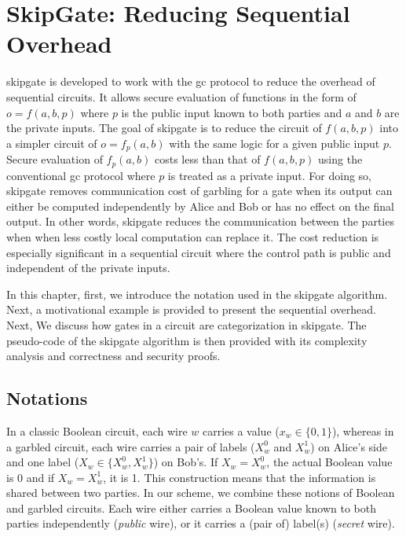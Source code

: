 \chapter{{SkipGate}: Reducing Sequential Overhead}\label{chap:skipgate}
\gls{skipgate} is developed to work with the \acrfull{gc} protocol to reduce the overhead of sequential circuits.
It allows secure evaluation of functions in the form of $o = f(a, b, p)$ where $p$ is the public input known to both parties and $a$ and $b$ are the private inputs.
The goal of \gls{skipgate} is to reduce the circuit of $f(a, b, p)$ into a simpler circuit of $o = f_p(a,b)$ with the same logic for a given public input $p$.
Secure evaluation of $f_p(a,b)$ costs less than that of $f(a, b, p)$ using the conventional \acrshort{gc} protocol where $p$ is treated as a private input.
For doing so, \gls{skipgate} removes communication cost of garbling for a gate when its output can either be computed independently by Alice and Bob or has no effect on the final output.
In other words, \gls{skipgate} reduces the communication between the parties when when less costly local computation can replace it.
The cost reduction is especially significant in a sequential circuit where the control path is public and independent of the private inputs.

In this chapter, first, we introduce the notation used in the \gls{skipgate} algorithm.
Next, a motivational example is provided to present the sequential overhead.
Next, We discuss how gates in a circuit are categorization in \gls{skipgate}.
The pseudo-code of the \gls{skipgate} algorithm is then provided with its complexity analysis and correctness and security proofs.

\section{Notations}\label{sec:skipgate-notation}
In a classic Boolean circuit, each wire $w$ carries a value ($x_w\in\{0, 1\}$), whereas in a garbled circuit, each wire carries a pair of labels ($X_w^{0}$ and $X_w^{1}$) on Alice's side and one label ($X_w \in \{X_w^{0}, X_w^{1}\}$) on Bob's.
If $X_w = X_w^{0}$, the actual Boolean value is 0 and if $X_w = X_w^{1}$, it is 1.
This construction means that the information is shared between two parties.
In our scheme, we combine these notions of Boolean and garbled circuits.
Each wire either carries a Boolean value known to both parties independently (\textit{public} wire), or it carries a (pair of) label(s) (\textit{secret} wire).


